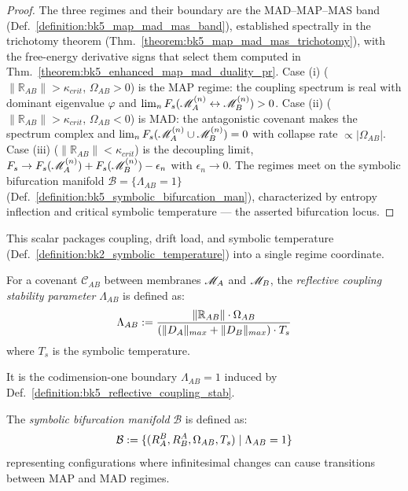 \begin{proof}
\label{proof:bk5_enhanced_map_mad_duality}
\leavevmode
The three regimes and their boundary are the MAD--MAP--MAS band (Def.~\ref{definition:bk5_map_mad_mas_band}), established spectrally in the trichotomy theorem (Thm.~\ref{theorem:bk5_map_mad_mas_trichotomy}), with the free-energy derivative signs that select them computed in Thm.~\ref{theorem:bk5_enhanced_map_mad_duality_pr}. Case (i) ($\|\mathbb{R}_{AB}\|>\kappa_{crit}$, $\Omega_{AB}>0$) is the MAP regime: the coupling spectrum is real with dominant eigenvalue $\varphi$ and $\lim_{n}F_s(\mathscr{M}_A^{(n)}\leftrightarrow\mathscr{M}_B^{(n)})>0$. Case (ii) ($\|\mathbb{R}_{AB}\|>\kappa_{crit}$, $\Omega_{AB}<0$) is MAD: the antagonistic covenant makes the spectrum complex and $\lim_{n}F_s(\mathscr{M}_A^{(n)}\cup\mathscr{M}_B^{(n)})=0$ with collapse rate $\propto|\Omega_{AB}|$. Case (iii) ($\|\mathbb{R}_{AB}\|<\kappa_{crit}$) is the decoupling limit, $F_s\to F_s(\mathscr{M}_A^{(n)})+F_s(\mathscr{M}_B^{(n)})-\epsilon_n$ with $\epsilon_n\to0$. The regimes meet on the symbolic bifurcation manifold $\mathcal{B}=\{\Lambda_{AB}=1\}$ (Def.~\ref{definition:bk5_symbolic_bifurcation_man}), characterized by entropy inflection and critical symbolic temperature --- the asserted bifurcation locus.
\end{proof}
\begin{definition} \label{definition:bk5_reflective_coupling_stab} 
This scalar packages coupling, drift load, and symbolic temperature (Def.~\ref{definition:bk2_symbolic_temperature}) into a single regime coordinate.

For a covenant $\mathcal{C}_{AB}$ between membranes $\mathscr{M}_A$ and $\mathscr{M}_B$, the \emph{reflective coupling stability parameter} $\Lambda_{AB}$ is defined as:
\begin{equation}
\Lambda_{AB} := \frac{\|\mathbb{R}_{AB}\| \cdot \Omega_{AB}}{(\|D_A\|_{max} + \|D_B\|_{max}) \cdot T_s}
\end{equation}
\noindent where $T_s$ is the symbolic temperature.
\end{definition}
\begin{definition} \label{definition:bk5_symbolic_bifurcation_man} 
It is the codimension-one boundary $\Lambda_{AB}=1$ induced by Def.~\ref{definition:bk5_reflective_coupling_stab}.

The \emph{symbolic bifurcation manifold} $\mathcal{B}$ is defined as:
\begin{equation}
\mathcal{B} := \{(R_A^B, R_B^A, \Omega_{AB}, T_s) \mid \Lambda_{AB} = 1 \}
\end{equation}
\noindent representing configurations where infinitesimal changes can cause transitions between MAP and MAD regimes.
\end{definition}
